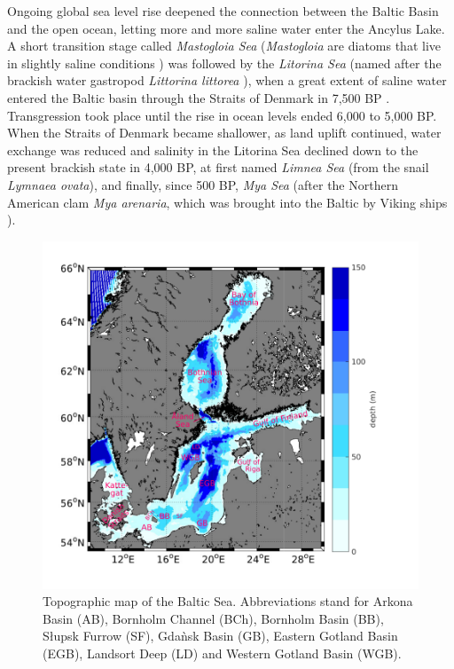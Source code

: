 Ongoing global sea level rise deepened the connection between the Baltic Basin 
and the open ocean, letting more and more saline water enter the Ancylus Lake. A 
short transition stage called \textit{Mastogloia Sea} (\textit{Mastogloia} are 
diatoms that live in slightly saline conditions \citep[][]{eronen2001}) was 
followed by the \textit{Litorina Sea} (named after the brackish water gastropod 
\textit{Littorina littorea} \citep[][]{eronen2001}), when a great extent of 
saline water entered the Baltic basin through the Straits of Denmark in 7,500 BP 
\citep[][]{bjoerk95}. Transgression took place until the rise in ocean levels 
ended 6,000 to 5,000 BP. When the Straits of Denmark became shallower, as land 
uplift continued, water exchange was reduced and salinity in the Litorina Sea 
declined down to the present brackish state in 4,000 BP, at first named 
\textit{Limnea Sea} (from the snail \textit{Lymnaea ovata}), and finally, since 
500 BP, \textit{Mya Sea} (after the Northern American clam \textit{Mya 
arenaria}, which was brought into the Baltic by Viking ships 
\citep[][]{bjoerck2008}).

\begin{figure}[ht]
 \flushleft
 \includegraphics[width=17cm]{bilder/baltic.pdf}
 \caption{Topographic map of the Baltic Sea. Abbreviations stand for Arkona 
Basin (AB), Bornholm Channel (BCh), Bornholm Basin (BB), S\l upsk Furrow (SF), 
Gda\`{n}sk Basin (GB), Eastern Gotland Basin (EGB), Landsort Deep (LD) and 
Western Gotland Basin (WGB).}\label{balticmap}
\end{figure}

